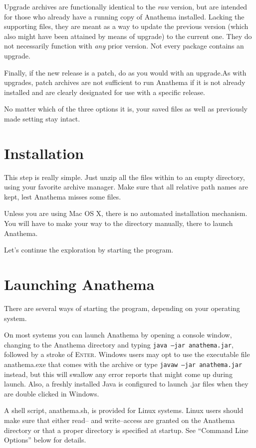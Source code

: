 Upgrade archives are functionally identical to the \emph{raw} version, but are intended for those who already have a running copy of Anathema installed. Lacking the supporting files, they are meant as a way to update the previous version (which also might have been attained by means of upgrade) to the current one. They do not necessarily function with \emph{any} prior version. Not every package contains an upgrade.

Finally, if the new release is a patch, do as you would with an upgrade.As with upgrades, patch archives are not sufficient to run Anathema if it is not already installed and are clearly designated for use with a specific release.

No matter which of the three options it is, your saved files as well as previously made setting stay intact.

\section{Installation}
This step is really simple. Just unzip all the files within to an empty directory, using your favorite archive manager. Make sure that all relative path names are kept, lest Anathema misses some files.

Unless you are using Mac OS X, there is no automated installation mechanism. You will have to make your way to the directory manually, there to launch Anathema. 
\medskip

Let's continue the exploration by starting the program.

\section{Launching Anathema }
There are several ways of starting the program, depending on your operating system.

On most systems you can launch Anathema by opening a console window, changing to the Anathema directory and typing \texttt{java --jar anathema.jar}, followed by a stroke of \textsc{Enter}.
Windows users may opt to use the executable file anathema.exe that comes with the archive or type \texttt{javaw --jar anathema.jar} instead, but this will swallow any error reports that might come up during launch. Also, a freshly installed Java is configured to launch .jar files when they are double clicked in Windows.

A shell script, anathema.sh, is provided for Linux systems. Linux users should make sure that either read-- and write--access are granted on the Anathema directory or that a proper directory is specified at startup. See ``Command Line Options'' below for details.
  
